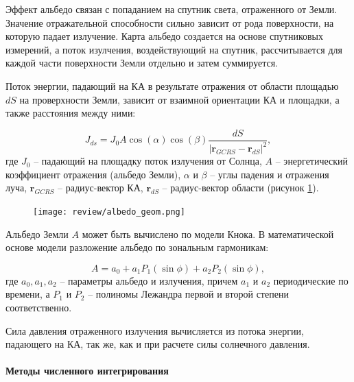Эффект альбедо связан с попаданием на спутник света, отраженного от Земли.
Значение отражательной способности сильно зависит от рода поверхности, на которую падает излучение.
Карта альбедо создается на основе спутниковых измерений, а поток изулчения,
воздействующий на спутник, рассчитывается для каждой части поверхности Земли отдельно и затем суммируется.

Поток энергии, падающий на КА в результате отражения от области площадью $dS$ на 
проверхности Земли, зависит от взаимной
ориентации КА и площадки, а также расстояния между ними:

\begin{equation*}
    J_{ds} = J_0 A \cos(\alpha) \cos (\beta) 
    \frac{dS}{|\mathbf{r}_{GCRS} - \mathbf{r}_{dS}|^2},
\end{equation*}
где $J_0$ -- падающий на площадку поток излучения от Солнца, 
$A$ -- энергетический коэффициент отражения (альбедо Земли),
$\alpha$ и $\beta$ -- углы падения и отражения луча, 
$\mathbf{r}_{GCRS}$ -- радиус-вектор КА,
$\mathbf{r}_{dS}$ -- радиус-вектор области (рисунок \ref{fig:albedo_geom}).

\begin{figure}[h!]
    \centering
    \texttt{[image: review/albedo\_geom.png]}
    \label{fig:albedo_geom}
\end{figure}

Альбедо Земли $A$ может быть вычислено по модели Кнока. В математической основе модели
разложение альбедо по зональным гармоникам:

\begin{equation*}
    A = a_0 + a_1 P_1 (\sin\phi) + a_2 P_2 (\sin \phi),
\end{equation*}
где $a_0, a_1, a_2$ -- параметры альбедо и излучения, причем $a_1$ и $a_2$ периодические по
времени, а $P_1$ и $P_2$ -- полиномы Лежандра первой и второй степени соответственно.

Сила давления отраженного излучения вычисляется из потока энергии, падающего на КА,
так же, как и при расчете силы солнечного давления.


\paragraph{Методы численного интегрирования} \mbox{} \\

